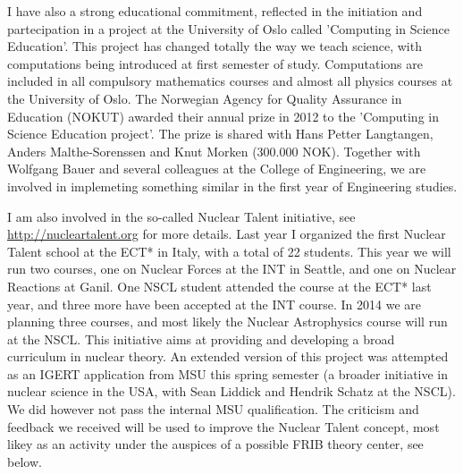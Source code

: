 \documentclass[prc,amsart,english,twocolumn,superscriptaddress,showpacs,floatfix]{revtex4}
\begin{document}
I have also a strong educational commitment, reflected in the initiation and partecipation in a project at the University of Oslo called 'Computing in Science Education'. This project has changed totally the way we teach science, with computations being introduced at first semester of study. Computations are included in all compulsory mathematics courses and almost all physics courses at the University of Oslo.  
The  Norwegian Agency for Quality Assurance in Education (NOKUT) awarded their annual prize in 2012 
to the 'Computing in Science Education project'. The prize is shared with Hans Petter Langtangen, Anders Malthe-Sorenssen and Knut Morken (300.000 NOK).
Together with Wolfgang Bauer and several colleagues at the College of Engineering, we are involved in implemeting something similar in the first
year of Engineering studies.

I am also involved in the so-called Nuclear Talent initiative, see \url{http://nucleartalent.org} for more details. 
Last year I organized the first Nuclear Talent school at the ECT* in Italy, with a total of 22 students. This year we will run two courses,
one on Nuclear Forces at the INT in Seattle, and one on Nuclear Reactions at Ganil. One NSCL student attended the course at the ECT* last year, and three more have been accepted at the INT course. In 2014 we are planning three courses, and most likely the Nuclear Astrophysics course will run at the NSCL.
 This initiative aims at providing and developing a broad curriculum in nuclear theory. An extended version of this project was attempted as an IGERT application from MSU this spring semester (a broader initiative in nuclear science in the USA, with Sean Liddick and Hendrik Schatz at the NSCL). We did however not pass the internal MSU qualification.  The criticism and feedback we received will be used to improve the Nuclear Talent concept, most likey as an activity under the auspices of a possible FRIB theory center, see below.
\end{document}
